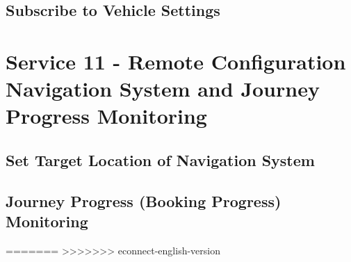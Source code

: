 \subsection*{Subscribe to Vehicle Settings}
\label{subsec:Nachrichten:Dienst10:BookingSettingsSubscription}














\section{Service 11 - Remote Configuration Navigation System and Journey Progress Monitoring}
\label{sec:Nachrichten:Dienst11}

\subsection*{Set Target Location of Navigation System}
\label{subsec:Nachrichten:Dienst11:SetNavigationDestination}





\subsection*{Journey Progress (Booking Progress) Monitoring}
\label{subsec:Nachrichten:Dienst11:BookingProgressSubscription}












=======
>>>>>>> econnect-english-version
